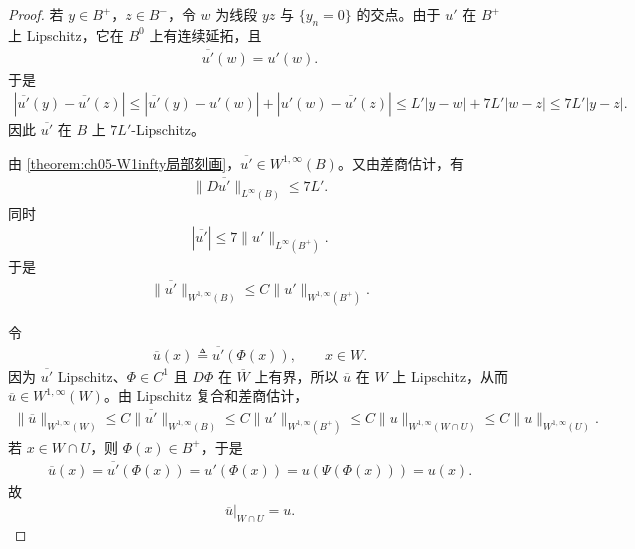 \documentclass[../../main.tex]{subfiles}
\begin{document}
\begin{proof}
若 \(y\in B^+\)，\(z\in B^-\)，令 \(w\) 为线段 \(yz\) 与 \(\{y_n=0\}\) 的交点。由于 \(u'\) 在 \(B^+\) 上 Lipschitz，它在 \(B^0\) 上有连续延拓，且
\begin{align*}
\overline{u'}(w)=u'(w).
\end{align*}
于是
\begin{align*}
|\overline{u'}(y)-\overline{u'}(z)|
\leqslant|\overline{u'}(y)-u'(w)|+|u'(w)-\overline{u'}(z)|\leqslant L'|y-w|+7L'|w-z|
\leqslant7L'|y-z|.
\end{align*}
因此 \(\overline{u'}\) 在 \(B\) 上 \(7L'\)-Lipschitz。

由 \cref{theorem:ch05-W1infty局部刻画}，\(\overline{u'}\in W^{1,\infty}(B)\)。又由差商估计，有
\begin{align*}
\|D\overline{u'}\|_{L^\infty(B)}\leqslant7L'.
\end{align*}
同时
\begin{align*}
|\overline{u'}|\leqslant7\|u'\|_{L^\infty(B^+)}.
\end{align*}
于是
\begin{align}
\|\overline{u'}\|_{W^{1,\infty}(B)}
\leqslant C\|u'\|_{W^{1,\infty}(B^+)}.
\label{eq:延拓u'-W1infty}
\end{align}

令
\begin{align*}
\overline u(x)\triangleq\overline{u'}(\Phi(x)),\qquad x\in W.
\end{align*}
因为 \(\overline{u'}\) Lipschitz、\(\Phi\in C^1\) 且 \(D\Phi\) 在 \(\overline W\) 上有界，所以 \(\overline u\) 在 \(W\) 上 Lipschitz，从而 \(\overline u\in W^{1,\infty}(W)\)。由 Lipschitz 复合和差商估计，
\begin{align}
\|\overline u\|_{W^{1,\infty}(W)}
\leqslant C\|\overline{u'}\|_{W^{1,\infty}(B)}
\leqslant C\|u'\|_{W^{1,\infty}(B^+)}
\leqslant C\|u\|_{W^{1,\infty}(W\cap U)}
\leqslant C\|u\|_{W^{1,\infty}(U)}.
\label{eq:局部延拓-W1infty}
\end{align}
若 \(x\in W\cap U\)，则 \(\Phi(x)\in B^+\)，于是
\begin{align*}
\overline u(x)
=\overline{u'}(\Phi(x))
=u'(\Phi(x))
=u(\Psi(\Phi(x)))
=u(x).
\end{align*}
故
\begin{align*}
\overline u\big|_{W\cap U}=u.
\end{align*}


\end{proof}
\end{document}
